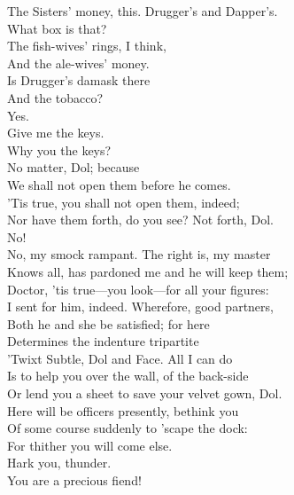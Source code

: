 \documentclass[a4paper,oneside,12pt]{memoir}
\begin{document}
\begin{drama*}
The Sisters' money, this. Drugger's and Dapper's.\\
\facespeaks What box is that?\\
\subtlespeaks {} The fish-wives' rings, I think,\\
And the ale-wives' money.\\
\facespeaks {} Is Drugger's damask there\\
And the tobacco?\\
\subtlespeaks {} Yes.\\
\facespeaks {} Give me the keys.\\
\dolspeaks Why you the keys?\\
\subtlespeaks {} No matter, Dol; because\\
We shall not open them before he comes.\\
\facespeaks 'Tis true, you shall not open them, indeed;\\
Nor have them forth, do you see? Not forth, Dol.\\
\dolspeaks No!\\
\facespeaks {} No, my smock rampant. The right is, my master\\
Knows all, has pardoned me and he will keep them;\\
Doctor, 'tis true---you look---for all your figures:\\
I sent for him, indeed. Wherefore, good partners,\\
Both he and she be satisfied; for here\\
Determines the indenture tripartite\\
'Twixt Subtle, Dol and Face. All I can do\\
Is to help you over the wall, of the back-side\\
Or lend you a sheet to save your velvet gown, Dol.\\
Here will be officers presently, bethink you\\
Of some course suddenly to 'scape the dock:\\
For thither you will come else.\\
 Hark you, thunder.\\
\subtlespeaks You are a precious fiend!\\

\end{drama*}
\end{document}
